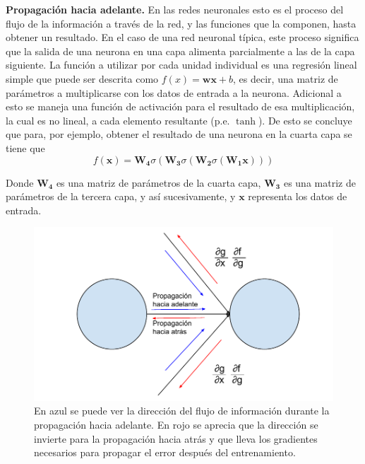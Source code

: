 \textbf{Propagación hacia adelante.} En las redes neuronales esto es el proceso del flujo de la información a través de la red, y las funciones que la componen, hasta obtener un resultado. En el caso de una red neuronal típica, este proceso significa que la salida de una neurona en una capa alimenta parcialmente a las de la capa siguiente. La función a utilizar por cada unidad individual es una regresión lineal simple que puede ser descrita como $f(x) = \mathbf{w} \mathbf{x} + b$, es decir, una matriz de parámetros a multiplicarse con los datos de entrada a la neurona. Adicional a esto se maneja una función de activación para el resultado de esa multiplicación, la cual es no lineal, a cada elemento resultante (p.e. $\tanh$). De esto se concluye que para, por ejemplo, obtener el resultado de una neurona en la cuarta capa se tiene que
\begin{equation}
\label{eq:feedfwdeq}
f(\mathbf{x}) = \mathbf{W_4} \sigma(\mathbf{W_3} \sigma (\mathbf{W_2} \sigma(\mathbf{W_1} \mathbf{x})))
\end{equation}

Donde $\mathbf{W_4}$ es una matriz de parámetros de la cuarta capa, $\mathbf{W_3}$ es una matriz de parámetros de la tercera capa, y así sucesivamente, y $\mathbf{x}$ representa los datos de entrada.

\begin{figure}
\includegraphics[scale=0.8]{Figures/backprop.pdf}
\caption{En azul se puede ver la dirección del flujo de información durante la propagación hacia adelante. En rojo se aprecia que la dirección se invierte para la propagación hacia atrás y que lleva los gradientes necesarios para propagar el error después del entrenamiento.}
\label{fig:backprop}
\end{figure}


